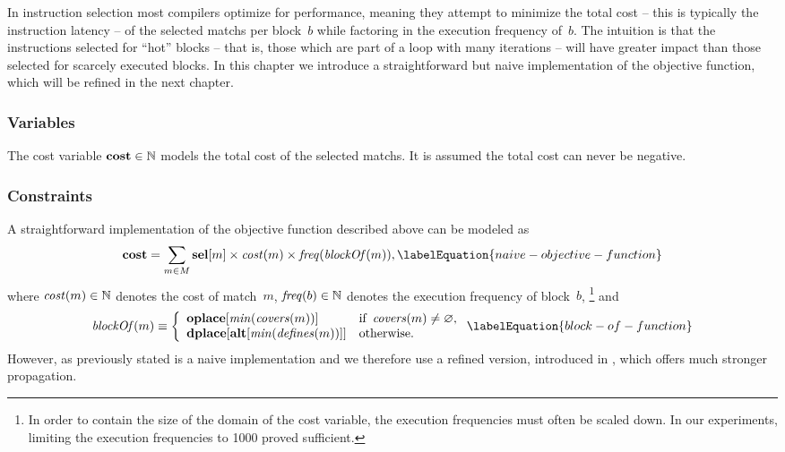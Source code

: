 In \gls{instruction selection} most \glspl{compiler} optimize for performance,
meaning they attempt to minimize the total cost -- this is typically the
\gls{instruction} latency -- of the selected \glspl{match} per \gls{block}~$b$
while factoring in the execution frequency of~$b$.
%
The intuition is that the \glspl{instruction} selected for ``hot'' \glspl{block}
-- that is, those which are part of a loop with many iterations -- will have
greater impact than those selected for scarcely executed \glspl{block}.
%
In this chapter we introduce a straightforward but naive implementation of the
\gls{objective function}, which will be refined in the next chapter.


\subsubsection{Variables}

The \gls{cost variable} \mbox{$\mVar{cost} \in \mathbb{N}$} models the total
cost of the selected \glspl{match}.
%
It is assumed the total cost can never be negative.


\subsubsection{Constraints}

A straightforward implementation of the \gls{objective function} described above
can be modeled as
%
\begin{equation}
  \mVar{cost} =
  \sum_{m \in \mMatchSet}
  \mVar{sel}[m] \times \mCost(m) \times \mFreq(\mBlockOf(m)),
  \labelEquation{naive-objective-function}
\end{equation}
%
where \mbox{$\operatorname{\textrm{\textit{cost}}}(m) \in \mathbb{N}$} denotes the cost of \gls{match}~$m$,
\mbox{$\operatorname{\textrm{\textit{freq}}}(b) \in \mathbb{N}$} denotes the execution frequency of
block~$b$\!,\hspace{-1pt}%
%
\footnote{%
  In order to contain the size of the \gls{domain} of the \gls{cost variable},
  the execution frequencies must often be scaled down.
  In our experiments, limiting the execution frequencies to \num{1000} proved
  sufficient.
}
%
and
%
\begin{equation}
  \mBlockOf(m)
  \equiv
  \left\{
  \begin{array}{ll}
      \mVar{oplace}[\mMin(\mCovers(m))]
    & \text{if } \mCovers(m) \neq \mEmptySet, \\
      \mVar{dplace}[\mVar{alt}[\mMin(\mDefines(m))]]
    & \text{otherwise}.
  \end{array}
  \right.
  \labelEquation{block-of-function}
\end{equation}
%
However, as previously stated  is a naive
implementation and we therefore use a refined version, introduced in
, which offers much stronger \gls{propagation}.


